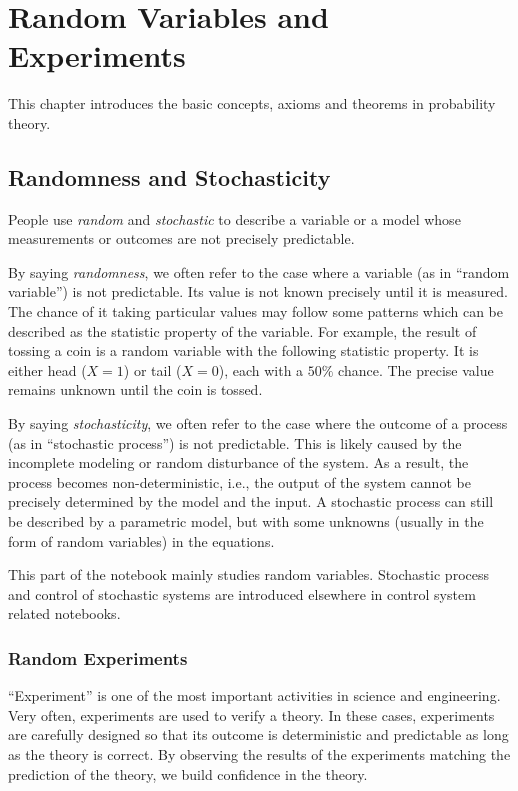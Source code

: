 \chapter{Random Variables and Experiments} \label{ch:pbbasics}

This chapter introduces the basic concepts, axioms and theorems in probability theory.

\section{Randomness and Stochasticity}

People use \textit{random} and \textit{stochastic} to describe a variable or a model whose measurements or outcomes are not precisely predictable.

By saying \textit{randomness}, we often refer to the case where a variable (as in ``random variable'') is not predictable. Its value is not known precisely until it is measured. The chance of it taking particular values may follow some patterns which can be described as the statistic property of the variable. For example, the result of tossing a coin is a random variable with the following statistic property. It is either head ($X=1$) or tail ($X=0$), each with a $50\%$ chance. The precise value remains unknown until the coin is tossed.

By saying \textit{stochasticity}, we often refer to the case where the outcome of a process (as in ``stochastic process'') is not predictable. This is likely caused by the incomplete modeling or random disturbance of the system. As a result, the process becomes non-deterministic, i.e., the output of the system cannot be precisely determined by the model and the input. A stochastic process can still be described by a parametric model, but with some unknowns (usually in the form of random variables) in the equations.

This part of the notebook mainly studies random variables. Stochastic process and control of stochastic systems are introduced elsewhere in control system related notebooks.

\subsection{Random Experiments}

``Experiment'' is one of the most important activities in science and engineering. Very often, experiments are used to verify a theory. In these cases, experiments are carefully designed so that its outcome is deterministic and predictable as long as the theory is correct. By observing the results of the experiments matching the prediction of the theory, we build confidence in the theory.

